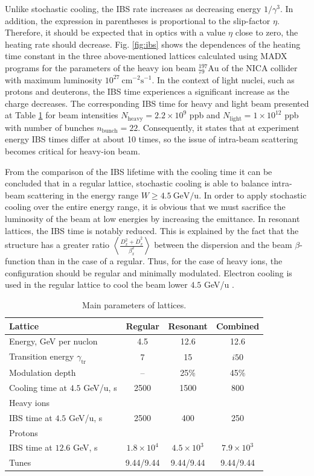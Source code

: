 \documentclass[submitting]{nst}
\begin{document}
	\noindent Unlike stochastic cooling, the IBS rate increases as decreasing energy $1/\gamma^3$. In addition, the expression in parentheses is proportional to the slip-factor $\eta$. Therefore, it should be expected that in optics with a value $\eta$ close to zero, the heating rate should decrease. Fig. \ref{fig:ibs} shows the dependences of the heating time constant in the three above-mentioned lattices calculated using MADX programs \cite{b10} for the parameters of the heavy ion beam ${_{79}^{197}}\text{Au}$ of the NICA collider with maximum luminosity ${10}^{27}\ {\text{cm}}^{-2}\text{s}^{-1}$. In the context of light nuclei, such as protons and deuterons, the IBS time experiences a significant increase as the charge decreases. The corresponding IBS time for heavy and light beam presented at Table \ref{tab:dual} for beam intensities $N_{\text{heavy}} = 2.2\times10^9$ ppb and $N_{\text{light}} = 1\times10^{12}$ ppb with number of bunches $n_{\text{bunch}}=22$. Consequently, it states that at experiment energy IBS times differ at about 10 times, so the issue of intra-beam scattering becomes critical for heavy-ion beam.
	\par From the comparison of the IBS lifetime with the cooling time it can be concluded that in a regular lattice, stochastic cooling is able to balance intra-beam scattering in the energy range $W\geq4.5\ \text{GeV/u}$. In order to apply stochastic cooling over the entire energy range, it is obvious that we must sacrifice the luminosity of the beam at low energies by increasing the emittance. In resonant lattices, the IBS time is notably reduced. This is explained by the fact that the structure has a greater ratio $\left\langle\frac{D_x^2+{\dot{D}}_x^2}{\beta_x^2}\right\rangle$ between the dispersion and the beam $\beta$-function than in the case of a regular. Thus, for the case of heavy ions, the configuration should be regular and minimally modulated. Electron cooling is used in the regular lattice to cool the beam lower $4.5$ GeV/u \cite{b11, b12}.
	
	\begin{table}[!htb]
		\caption{Main parameters of lattices.}
		\label{tab:dual}
		\begin{tabular*}{8cm} {@{\extracolsep{\fill} } lccc}
			\toprule
			Lattice & Regular & Resonant & Combined \\
			\midrule
			Energy, GeV per nuclon & 4.5 & 12.6 & 12.6 \\
			Transition energy $\gamma_{\text{tr}}$  & 7 & 15 & $i50$ \\
			Modulation depth & -- & 25\% & 45\% \\
			Cooling time at $4.5$ GeV/u, s & 2500 & 1500 & 800 \\
			Heavy ions\\ IBS time at $4.5$ GeV/u, s & 2500 & 400 & 250 \\
			Protons\\ IBS time at $12.6$ GeV, s & $1.8\times10^{4}$ & $4.5\times10^3$ & $7.9\times10^3$ \\
			Tunes &9.44/9.44&9.44/9.44&9.44/9.44\\
			\bottomrule
		\end{tabular*}
	\end{table}
	
\end{document}

